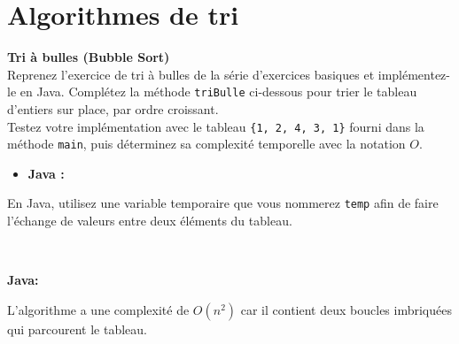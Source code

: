 \section{Algorithmes de tri}

\begin{Exercice} [20 minutes] [Java] \textbf{Tri à bulles (Bubble Sort)} \optionnel \\
Reprenez l'exercice de tri à bulles de la série d'exercices basiques et implémentez-le en Java. Complétez la méthode \texttt{triBulle} ci-dessous pour trier le tableau d'entiers sur place, par ordre croissant. \\

Testez votre implémentation avec le tableau \texttt{\{1, 2, 4, 3, 1\}} fourni dans la méthode \texttt{main}, puis déterminez sa complexité temporelle avec la notation $O$.

\begin{itemize}
        \item \textbf{Java :}
             
    \end{itemize}
    
    \begin{conseil}
    En Java, utilisez une variable temporaire que vous nommerez \lstinline{temp} afin de faire l'échange de valeurs entre deux éléments du tableau.
    \end{conseil}
    
    \ \\
    
    \begin{solution}
    \textbf{Java:}
     

    \end{solution}
    \begin{solution}
     

    \end{solution}

    \begin{solution}
    L'algorithme a une complexité de $O(n^2)$ car il contient deux boucles imbriquées qui parcourent le tableau.
    \end{solution}
            

\end{Exercice}

